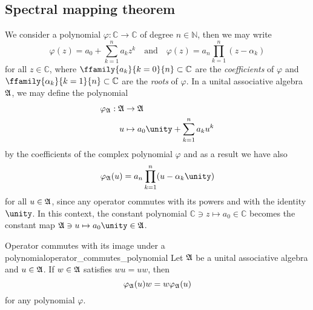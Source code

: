 \subsection{Spectral mapping theorem}
We consider a polynomial \(\varphi : \mathbb{C} \to \mathbb{C}\) of degree \(n \in \mathbb{N}\), then we may write
\begin{equation*}
    \varphi(z) = a_0 + \sum_{k = 1}^n a_k z^k
    \quad\text{and}\quad
    \varphi(z) = a_n \prod_{k = 1}^n (z - \alpha_k)
\end{equation*}
for all \(z \in \mathbb{C}\), where \(\ffamily{a_k}{k = 0}{n}\subset \mathbb{C} \) are the \emph{coefficients} of \(\varphi\) and \(\ffamily{\alpha_k}{k=1}{n} \subset \mathbb{C}\) are the \emph{roots} of \(\varphi\). In a unital associative algebra \(\mathfrak{A}\), we may define the polynomial
\begin{align*}
    \varphi_{\algebra{A}} : \algebra{A} &\to \algebra{A}\\
    u &\mapsto a_0 \unity + \sum_{k=1}^{n} a_k u^k
\end{align*}
by the coefficients of the complex polynomial \(\varphi\) and as a result we have also
\begin{equation*}
    \varphi_\algebra{A}(u) = a_n \prod_{k=1}^n (u - \alpha_k \unity)
\end{equation*}
for all \(u \in \mathfrak{A}\), since any operator commutes with its powers and with the identity \(\unity\). In this context, the constant polynomial \(\mathbb{C} \ni z \mapsto a_0 \in \mathbb{C}\) becomes the constant map \(\algebra{A} \ni u \mapsto a_0\unity \in \algebra{A}\).
\begin{proposition}{Operator commutes with its image under a polynomial}{operator_commutes_polynomial}
    Let \(\mathfrak{A}\) be a unital associative algebra and \(u \in \mathfrak{A}\). If \(w \in \mathfrak{A}\) satisfies \(w u = uw\), then
    \begin{equation*}
        \varphi_{\mathfrak{A}}(u)w = w\varphi_{\mathfrak{A}}(u)
    \end{equation*}
    for any polynomial \(\varphi\).
\end{proposition}
